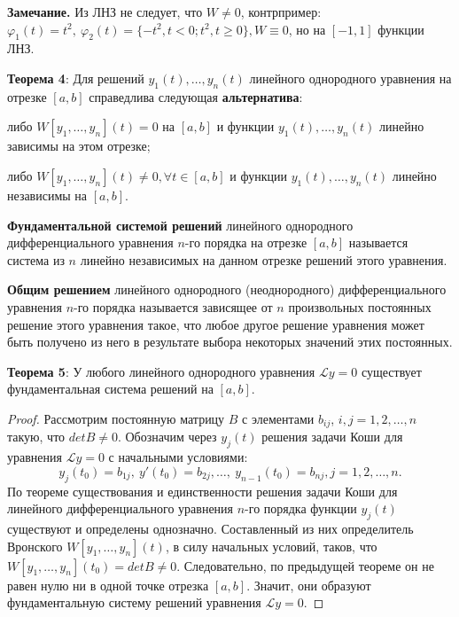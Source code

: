 
\textbf{Замечание.} Из ЛНЗ не следует, что $W\neq 0$, контрпример: $\varphi_1(t) = t^2,~\varphi_2(t) = \{-t^2, t < 0; t^2, t \geq 0\}, W \equiv 0$, но на $[-1, 1]$ функции ЛНЗ.

\textbf{Теорема 4}: Для решений $y_1(t),\dots, y_n(t)$ линейного однородного уравнения на отрезке $[a, b]$ справедлива следующая \textbf{альтернатива}: 

либо $W[y_1,\dots, y_n](t) = 0$ на $[a, b]$ и функции $y_1(t),\dots ,y_n(t)$ линейно зависимы на этом отрезке;

либо $W[y_1,\dots ,y_n](t)\neq 0, \forall t \in [a, b]$ и функции $y_1(t),\dots , y_n(t)$ линейно независимы на $[a, b]$.

\textbf{Фундаментальной системой решений} линейного однородного дифференциального уравнения $n$-го порядка на отрезке $[a, b]$ называется система из $n$ линейно независимых на данном отрезке решений этого уравнения.

\textbf{Общим решением} линейного однородного (неоднородного) дифференциального уравнения $n$-го порядка называется зависящее от $n$ произвольных постоянных решение этого уравнения такое, что любое другое решение уравнения может быть получено из него в результате выбора некоторых значений этих постоянных.

\textbf{Теорема 5}: У любого линейного однородного уравнения $\mathcal{L}y = 0$ существует фундаментальная система решений на $[a, b]$.

\begin{proof}
Рассмотрим постоянную матрицу $B$ с элементами $b_{ij}$, $i,j = 1, 2,\dots , n$ такую, что $det B\neq  0$. Обозначим через $y_j(t)$ решения задачи Коши для уравнения $\mathcal{L} y = 0$ с начальными условиями:
$$y_j(t_0) = b_{1j},~y'(t_0) = b_{2j},\dots ,~y_{n-1}(t_0) = b_{nj}, j = 1,2,\dots ,n.$$
По теореме существования и единственности решения задачи Коши для линейного дифференциального уравнения $n$-го порядка функции $y_j(t)$ существуют и определены однозначно. Составленный из них определитель Вронского $W[y_1,\dots , y_n](t)$, в силу начальных условий, таков, что
$W[y_1,\dots ,y_n](t_0) = detB\neq 0$. Следовательно, по предыдущей теореме он не равен нулю ни в одной точке отрезка $[a, b]$. Значит, они образуют фундаментальную систему решений уравнения $\mathcal{L}y = 0$.
\end{proof}

